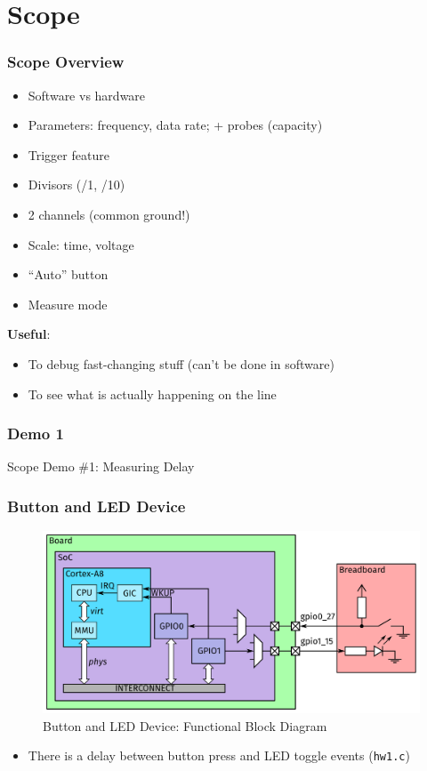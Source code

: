 \section{Scope}

\begin{frame}
  \frametitle{Scope Overview}
  \begin{itemize}
    \item Software vs hardware
    \item Parameters: frequency, data rate; + probes (capacity)
    \item Trigger feature
    \item Divisors (/1, /10)
    \item 2 channels (common ground!)
    \item Scale: time, voltage
    \item ``Auto'' button
    \item Measure mode
  \end{itemize}
  \textbf{Useful}:
  \begin{itemize}
    \item To debug fast-changing stuff (can't be done in software)
    \item To see what is actually happening on the line
  \end{itemize}
  \vspace*{-5mm}
\end{frame}

\begin{frame}[standout]
  \frametitle{Demo 1}
  Scope Demo \#1: Measuring Delay
\end{frame}

\begin{frame}
  \frametitle{Button and LED Device}
  \vspace*{-3mm}
  \begin{figure}
    \centering
    \includegraphics[scale=0.22]{images/architecture2.pdf}
    \caption{Button and LED Device: Functional Block Diagram}
  \end{figure}

  \begin{itemize}
    \item There is a delay between button press and LED toggle events
          (\texttt{hw1.c})
  \end{itemize}
  \vspace*{-2mm}
\end{frame}

